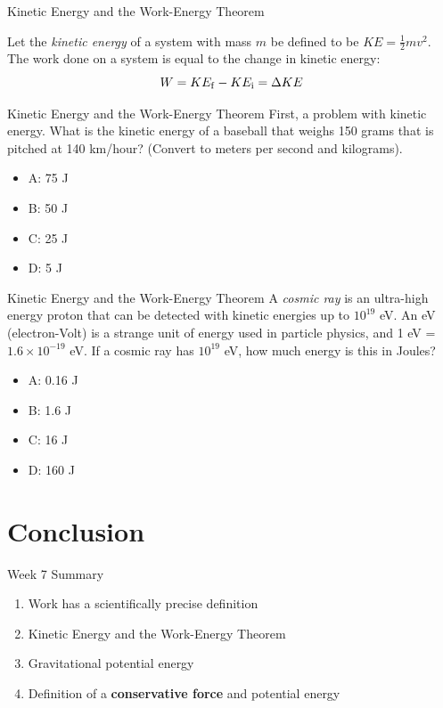 \documentclass{beamer}
\begin{document}
\begin{frame}{Kinetic Energy and the Work-Energy Theorem}
\begin{tcolorbox}[colback=white,colframe=red!40!blue,title=The Work-Energy Theorem]
\small
\alert{
Let the \textit{kinetic energy} of a system with mass $m$ be defined to be $KE = \frac{1}{2}mv^2$.  The work done on a system is equal to the change in kinetic energy:
\begin{equation}
W = KE_{\rm f} - KE_{\rm i} = \Delta KE
\end{equation}
}
\end{tcolorbox}
\end{frame}

\begin{frame}{Kinetic Energy and the Work-Energy Theorem}
First, a problem with kinetic energy.  What is the kinetic energy of a baseball that weighs 150 grams that is pitched at 140 km/hour?  (Convert to meters per second and kilograms).
\begin{itemize}
\item A: 75 J
\item B: 50 J
\item C: 25 J
\item D: 5 J
\end{itemize}
\end{frame}

\begin{frame}{Kinetic Energy and the Work-Energy Theorem}
A \textit{cosmic ray} is an ultra-high energy proton that can be detected with kinetic energies up to $10^{19}$ eV.  An eV (electron-Volt) is a strange unit of energy used in particle physics, and 1 eV = $1.6 \times 10^{-19}$ eV.  If a cosmic ray has $10^{19}$ eV, how much energy is this in Joules?
\begin{itemize}
\item A: 0.16 J
\item B: 1.6 J
\item C: 16 J
\item D: 160 J
\end{itemize}
\end{frame}

\section{Conclusion}

\begin{frame}{Week 7 Summary}
\begin{enumerate}
\item \alert{Work} has a scientifically precise definition
\item Kinetic Energy and the \alert{Work-Energy Theorem}
\item Gravitational potential energy
\item Definition of a \textbf{conservative force} and potential energy
\end{enumerate}
\end{frame}
\end{document}
